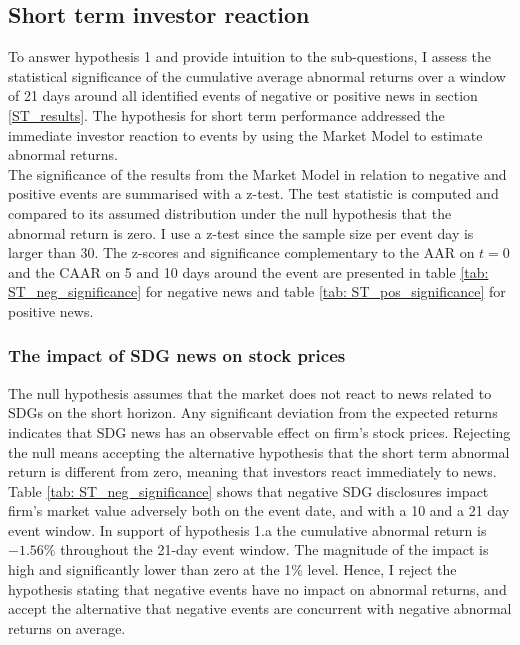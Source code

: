 
\subsection{Short term investor reaction} \label{sec: short_term_analysis}
To answer hypothesis 1 and provide intuition to the sub-questions, I assess the statistical significance of the cumulative average abnormal returns over a window of 21 days around all identified events of negative or positive news in section \ref{ST_results}. The hypothesis for short term performance addressed the immediate investor reaction to events by using the Market Model to estimate abnormal returns. \\

The significance of the results from the Market Model in relation to negative and positive events are summarised with a z-test. The test statistic is computed and compared to its assumed distribution under the null hypothesis that the abnormal return is zero. I use a z-test since the sample size per event day is larger than 30. The z-scores and significance complementary to the AAR on $t=0$ and the CAAR on 5 and 10 days around the event are presented in table \ref{tab: ST_neg_significance} for negative news and table \ref{tab: ST_pos_significance} for positive news.  

\subsubsection{The impact of SDG news on stock prices }

The null hypothesis assumes that the market does not react to news related to SDGs on the short horizon. Any significant deviation from the expected returns indicates that SDG news has an observable effect on firm's stock prices.  Rejecting the null means accepting the alternative hypothesis that the short term abnormal return is different from zero, meaning that investors react immediately to news. \\
 
Table \ref{tab: ST_neg_significance} shows that negative SDG disclosures impact firm's market value adversely both on the event date, and with a 10 and a 21 day event window. In support of hypothesis 1.a the cumulative abnormal return is $-1.56\%$ throughout the 21-day event window. The magnitude of the impact is high and significantly lower than zero at the 1\% level. Hence, I reject the hypothesis stating that negative events have no impact on abnormal returns, and accept the alternative that negative events are concurrent with negative abnormal returns on average. 


